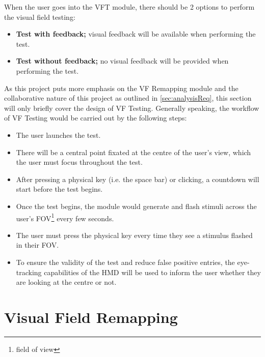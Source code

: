 \documentclass{l4proj}
\begin{document}
When the user goes into the VFT module, there should be 2 options to perform the visual field testing:
\begin{itemize}
    \item \textbf{Test with feedback;} visual feedback will be available when performing the test.
    \item \textbf{Test without feedback;} no visual feedback will be provided when performing the test.
\end{itemize}

As this project puts more emphasis on the VF Remapping module and the collaborative nature of this project as outlined in \ref{sec:analysisReq}, this section will only briefly cover the design of VF Testing. Generally speaking, the workflow of VF Testing would be carried out by the following steps:

\begin{itemize}
    \item The user launches the test.
    \item There will be a central point fixated at the centre of the user's view, which the user must focus throughout the test.
    \item After pressing a physical key (i.e. the space bar)  or clicking, a countdown will start before the test begins.
    \item Once the test begins, the module would generate and flash stimuli across the user's FOV\footnote{field of view} every few seconds.
    \item The user must press the physical key every time they see a stimulus flashed in their FOV.
    \item To ensure the validity of the test and reduce false positive entries, the eye-tracking capabilities of the HMD will be used to inform the user whether they are looking at the centre or not.
\end{itemize}



\section{Visual Field Remapping}
\label{sec:VFR}
\end{document}
